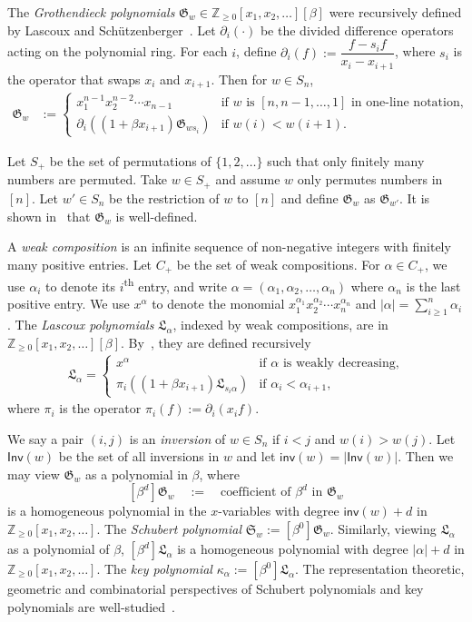 \documentclass[ALCO]{cedram}
\newcommand{\fG}{\mathfrak{G}}
\newcommand{\fGb}{\fG}
\newcommand{\fL}{\mathfrak{L}}
\newcommand{\fLb}{\fL}
\newcommand{\fS}{\mathfrak{S}}
\newcommand{\Z}{\mathbb{Z}}
\newcommand{\Inv}{\mathsf{Inv}}
\newcommand{\inv}{\mathsf{inv}}
\newcommand{\definition}[1]{{\color{darkred}\emph{#1}}}
\begin{document}
The \definition{Grothendieck polynomials} $\fGb_w \in 
\mathbb{Z}_{\geqslant 0}[x_1, x_2, \dots][\beta]$
were recursively defined by Lascoux and Sch{\"u}tzenberger~\cite{LS:Groth}. 
Let $\partial_i(\cdot)$ be the divided difference operators acting 
on the polynomial ring.
For each $i$,
define $\partial_i(f) := \dfrac{f - s_i f}{x_i-x_{i+1}}$,
where $s_i$ is the operator that swaps $x_i$ and $x_{i+1}$.
Then for $w\in S_n$, 
\begin{align*}
\fGb_w &:=
\begin{cases}
x_1^{n-1}x_2^{n-2}\cdots x_{n-1} &\text{if $w$ is $[n, n-1, \dots, 1]$ in one-line notation,} \\
\partial_i( (1 + \beta x_{i+1}) \fGb_{ws_i} ) &\text{if $w(i)<w(i+1)$.}
\end{cases}
\end{align*}

Let $S_+$ be the set of permutations
of $\{1, 2, \dots\}$
such that only finitely many numbers are permuted.
Take $w \in S_+$ and assume $w$ only permutes numbers in $[n]$.
Let $w' \in S_n$ be the restriction of $w$ to $[n]$
and define $\fGb_w$ as $\fGb_{w'}$.
It is shown in~\cite{LS:Groth} that $\fGb_w$ is well-defined.

A \definition{weak composition}
is an infinite sequence of non-negative integers with finitely many positive entries. 
Let $C_+$ be the set of weak compositions. 
For $\alpha \in C_+$, 
we use $\alpha_i$ to denote its $i$\textsuperscript{th} entry,
and write $\alpha = (\alpha_1, \alpha_2, \dots, \alpha_n)$ 
where $\alpha_n$ is the last positive entry. 
We use $x^\alpha$ to denote the monomial
$x_1^{\alpha_1}x_2^{\alpha_2}\cdots x_n^{\alpha_n}$ and
$|\alpha| = \sum_{i\geqslant 1}^n\alpha_i$.
The \definition{Lascoux polynomials} 
$\fLb_\alpha$, indexed by weak compositions,
are in $\mathbb{Z}_{\geqslant 0}[x_1, x_2, \dots][\beta]$. 
By~\cite{Las}, they are defined recursively
\begin{align*}
\fLb_\alpha = \begin{cases}
x^\alpha & \text{if $\alpha$ is weakly decreasing,} \\
\pi_i ((1 + \beta x_{i+1}) \fLb_{s_i\alpha} ) &\text{if $\alpha_i<\alpha_{i+1}$,}
\end{cases}
\end{align*}
where $\pi_i$ is the operator $\pi_i(f) := \partial_i(x_i f)$.


We say a pair $(i,j)$ is an \definition{inversion}
of $w \in S_n$ if $i < j$ and $w(i) > w(j)$. 
Let $\Inv(w)$ be the set of all inversions in $w$
and let $\inv(w) = |\Inv(w)|$.
Then we may view $\fGb_w$ as a polynomial in $\beta$, where
$$
[\beta^d] \fGb_w \quad := \quad \textrm{coefficient of $\beta^d$ in $\fGb_w$}
$$
is a homogeneous polynomial in the $x$-variables with degree 
$\inv(w) + d$ in $\Z_{\geq 0}[x_1,x_2,\dots]$.
The \definition{Schubert polynomial} $\fS_w := [\beta^0]\fGb_w$.
Similarly, viewing $\fLb_\alpha$ as a polynomial of $\beta$,
$[\beta^d] \fLb_\alpha$ is a homogeneous polynomial with degree
$|\alpha| + d$ in $\Z_{\geq 0}[x_1,x_2,\dots]$.
The \definition{key polynomial} $\kappa_\alpha := [\beta^0]\fLb_\alpha$.
The representation theoretic, geometric and combinatorial perspectives of Schubert polynomials and key polynomials
are well-studied~\cite{De,LS1,BJS}.
\end{document}
